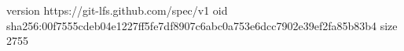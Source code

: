 version https://git-lfs.github.com/spec/v1
oid sha256:00f7555cdeb04e1227ff5fe7df8907c6abc0a753e6dcc7902e39ef2fa85b83b4
size 2755
